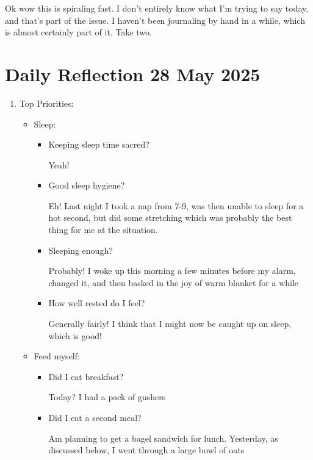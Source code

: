 \documentclass[12pt]{article}
\renewcommand{\,}{\textsuperscript{,}}
\begin{document}
Ok wow this is spiraling fast.  
I don't entirely know what I'm trying to say today, and that's part of the issue.  
I haven't been journaling by hand in a while, which is almost certainly part of it.  
Take two.
\section{Daily Reflection 28 May 2025}

\begin{enumerate}

\item Top Priorities:

\begin{itemize}

\item Sleep:

\begin{itemize}

\item Keeping sleep time sacred?

Yeah!

\item Good sleep hygiene?

Eh! Last night I took a nap from 7-9, was then unable to sleep for a hot second, but did some stretching which was probably the best thing for me at the situation.

\item Sleeping enough?

Probably! I woke up this morning a few minutes before my alarm, changed it, and then basked in the joy of warm blanket for a while

\item How well rested do I feel?

Generally fairly! I think that I might now be caught up on sleep, which is good!

\end{itemize}

\item Feed myself:

\begin{itemize}

\item Did I eat breakfast?

Today? I had a pack of gushers

\item Did I eat a second meal?

Am planning to get a bagel sandwich for lunch. Yesterday, as discussed below, I went through a large bowl of oats


\end{itemize}
\end{itemize}
\end{enumerate}
\end{document}
